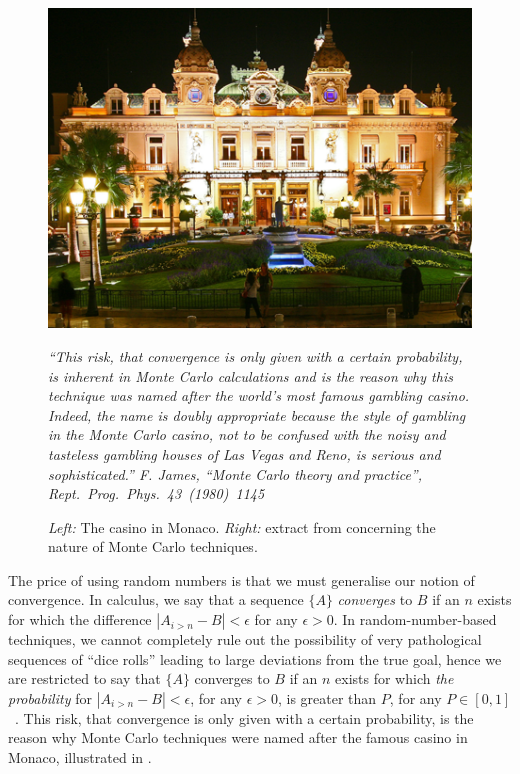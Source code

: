 \begin{figure}[t]
\centering
\begin{minipage}{0.45\textwidth}
\includegraphics*[scale=0.5]{montecarlo.png}
\end{minipage}
 \hfill  
{}%
%
\begin{minipage}[c]{0.46\textwidth}\it
``This risk, that convergence is only given with a certain probability,
is inherent in Monte Carlo calculations and is the reason why this
technique was named after the world's most famous gambling
casino. Indeed, the name is doubly appropriate because the style of
gambling in the Monte Carlo casino, not to be confused with the noisy
and tasteless gambling houses of Las Vegas and Reno, is serious and
sophisticated.''
\flushright \color{gray}
F. James, ``Monte Carlo theory and practice'',\\ 
Rept.~Prog.~Phys.~43~(1980)~1145 
\end{minipage}
\caption{{\sl Left:} The casino in Monaco. {\sl Right:} 
%
extract from \cite{James:1980yn} 
concerning the nature of Monte Carlo techniques.
\label{fig:montecarlo}}
\end{figure}

The price of using random numbers is that we must generalise our
notion of convergence. 
In calculus, we say that a sequence $\{A\}$ \emph{converges} to $B$ if
an $n$ exists for which the difference $|A_{i>n} -B|<\epsilon$ for any
$\epsilon > 0$. In random-number-based techniques, we cannot
completely rule out the possibility of very pathological sequences of
``dice rolls'' leading to large deviations from the true goal, 
hence we are restricted to
say that $\{A\}$ converges to $B$ if an $n$ exists for which \emph{the
probability} for $|A_{i>n} - B| < \epsilon$, for any $\epsilon > 0$,
is greater than $P$, for any $P\in[0,1]$~\cite{James:1980yn}. 
This risk, that convergence
is only given with a certain probability, is the reason why Monte
Carlo techniques were named after the famous casino in Monaco, 
illustrated in . 

